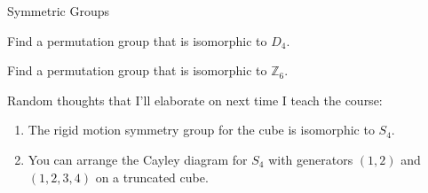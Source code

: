 \begin{section}{Symmetric Groups}
\begin{exercise}
Find a permutation group that is isomorphic to $D_4$.
\end{exercise}

\begin{exercise}
Find a permutation group that is isomorphic to $\mathbb{Z}_6$.
\end{exercise}

Random thoughts that I'll elaborate on next time I teach the course:
\begin{enumerate}
\item The rigid motion symmetry group for the cube is isomorphic to $S_4$.
\item You can arrange the Cayley diagram for $S_4$ with generators $(1,2)$ and $(1,2,3,4)$ on a truncated cube. 
\end{enumerate}

\end{section}

